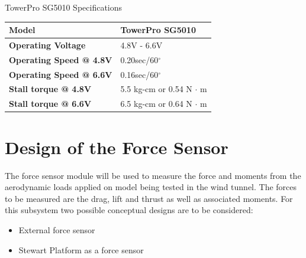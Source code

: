 \begin{table}[!h]
\caption[Motor Specifications]{TowerPro SG5010 Specifications}
\end{table}
\begin{center}
\begin{tabular}{|l|l|}
\hline
\textbf{Model}& TowerPro SG5010\\
\hline
\textbf{Operating Voltage} & 4.8V - 6.6V\\
\hline
\textbf{Operating Speed @ 4.8V} & 0.20sec/60$^{\circ}$\\
\hline
\textbf{Operating Speed @ 6.6V}& 0.16sec/60$^{\circ}$\\
\hline
\textbf{Stall torque @ 4.8V} & 5.5 kg-cm or 0.54 N $\cdot$ m\\
\hline
\textbf{Stall torque @ 6.6V} & 6.5 kg-cm or 0.64 N $\cdot$ m\\
\hline
\end{tabular}
\end{center}

\section{Design of the Force Sensor}
The force sensor module will be used to measure the force and moments from the aerodynamic loads applied on model being tested in the wind tunnel. The forces to be measured are the drag, lift and thrust as well as associated moments. For this subsystem two possible conceptual designs are to be considered:
\begin{itemize}
\item External force sensor
\item Stewart Platform as a force sensor
\end{itemize}
